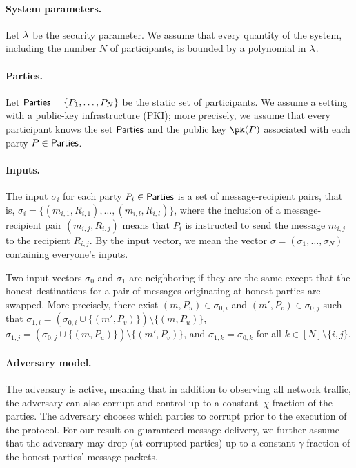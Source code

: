 \documentclass[runningheads,a4paper]{llncs}
\begin{document}
\paragraph{System parameters.}
Let $\lambda$ be the security parameter. We assume that every quantity of the system, including the number $N$ of participants, is bounded by a polynomial in $\lambda$. 

\paragraph{Parties.} 
Let $\mathsf{Parties} = \{P_1, \dots, P_N\}$ be the static set of participants. We assume a setting with a public-key infrastructure (PKI); more precisely, we assume that every participant knows the set $\mathsf{Parties}$ and the public key $\pk(P)$ associated with each party $P \in \mathsf{Parties}$.

\paragraph{Inputs.} 
The input $\sigma_i$ for each party $P_i \in \mathsf{Parties}$ is a set of message-recipient pairs, that is, $\sigma_i = \{ (m_{i,1}, R_{i,1}), \dots, (m_{i,l},R_{i,l}) \}$, where the inclusion of a message-recipient pair $(m_{i,j},R_{i,j})$ means that $P_i$ is instructed to send the message $m_{i,j}$ to the recipient $R_{i,j}$. By the input vector, we mean the vector $\sigma = (\sigma_1, \dots, \sigma_N)$ containing everyone's inputs. 

Two input vectors $\sigma_0$ and $\sigma_1$ are neighboring if they are the same except that the honest destinations for a pair of messages originating at honest parties are swapped. 
More precisely, there exist $(m, P_u) \in \sigma_{0, i}$ and $(m', P_v) \in \sigma_{0, j}$ such that $\sigma_{1,i} = (\sigma_{0,i}\cup\{(m', P_v)\})\setminus\{(m, P_u)\}$, $\sigma_{1,j} = (\sigma_{0,j}\cup\{(m, P_u)\})\setminus\{(m', P_v)\}$, and $\sigma_{1,k}=\sigma_{0,k}$ for all $k\in [N]\setminus\{i,j\}$. 


\paragraph{Adversary model.} 
The adversary is active, meaning that in addition to observing all network traffic, the adversary can also corrupt and control up to a constant~$\chi$ fraction of the parties. The adversary chooses which parties to corrupt prior to the execution of the protocol. 
For our result on guaranteed message delivery, we further assume that the adversary may drop (at corrupted parties) up to a constant $\gamma$ fraction of the honest parties' message packets. 
\end{document}
